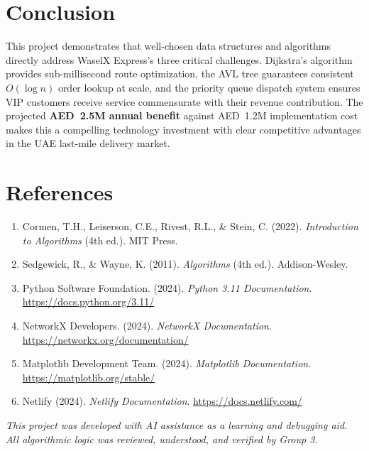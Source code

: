 \documentclass[12pt,a4paper]{article}
\begin{document}
\section{Conclusion}

This project demonstrates that well-chosen data structures and algorithms directly address WaselX Express's three critical challenges. Dijkstra's algorithm provides sub-millisecond route optimization, the AVL tree guarantees consistent $O(\log n)$ order lookup at scale, and the priority queue dispatch system ensures VIP customers receive service commensurate with their revenue contribution. The projected \textbf{AED~2.5M annual benefit} against AED~1.2M implementation cost makes this a compelling technology investment with clear competitive advantages in the UAE last-mile delivery market.

\newpage
\section*{References}

\begin{enumerate}[nosep,leftmargin=*]
    \item Cormen, T.H., Leiserson, C.E., Rivest, R.L., \& Stein, C. (2022). \textit{Introduction to Algorithms} (4th ed.). MIT Press.
    \item Sedgewick, R., \& Wayne, K. (2011). \textit{Algorithms} (4th ed.). Addison-Wesley.
    \item Python Software Foundation. (2024). \textit{Python 3.11 Documentation}. \url{https://docs.python.org/3.11/}
    \item NetworkX Developers. (2024). \textit{NetworkX Documentation}. \url{https://networkx.org/documentation/}
    \item Matplotlib Development Team. (2024). \textit{Matplotlib Documentation}. \url{https://matplotlib.org/stable/}
    \item Netlify (2024). \textit{Netlify Documentation}. \url{https://docs.netlify.com/}
\end{enumerate}

\vfill
\begin{center}
\small\color{WaselDark}
\textit{This project was developed with AI assistance as a learning and debugging aid.\\All algorithmic logic was reviewed, understood, and verified by Group 3.}
\end{center}
\end{document}
